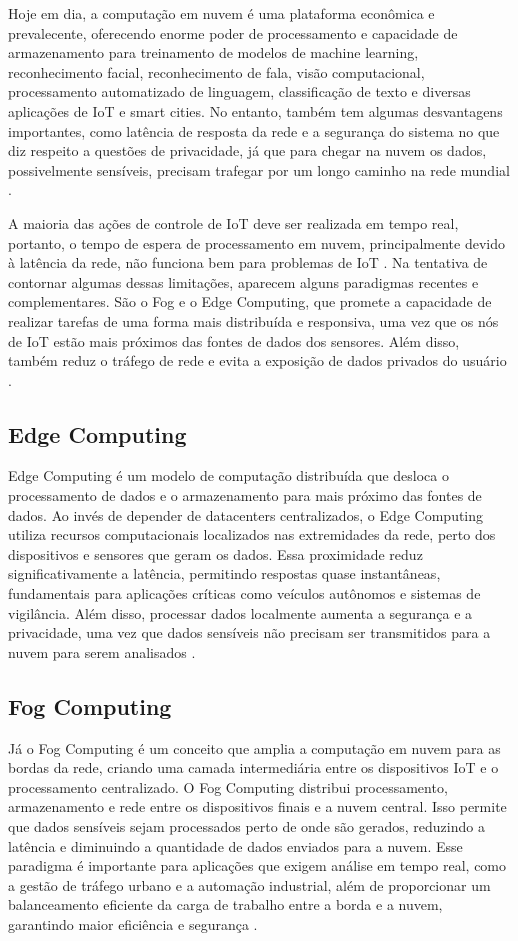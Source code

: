Hoje em dia, a computação em nuvem é uma plataforma econômica e prevalecente, oferecendo enorme poder de processamento e capacidade de armazenamento para treinamento de modelos de machine learning, reconhecimento facial, reconhecimento de fala, visão computacional, processamento automatizado de linguagem, classificação de texto e diversas aplicações de IoT e smart cities. No entanto, também tem algumas desvantagens importantes, como latência de resposta da rede e a segurança do sistema no que diz respeito a questões de privacidade, já que para chegar na nuvem os dados, possivelmente sensíveis, precisam trafegar por um longo caminho na rede mundial \cite{Pacheco2018}.

A maioria das ações de controle de IoT deve ser realizada em tempo real, portanto, o tempo de espera de processamento em nuvem, principalmente devido à latência da rede, não funciona bem para problemas de IoT \cite{Singh2017}. Na tentativa de contornar algumas dessas limitações, aparecem alguns paradigmas recentes e complementares. São o Fog e o Edge Computing, que promete a capacidade de realizar tarefas de uma forma mais distribuída e responsiva, uma vez que os nós de IoT estão mais próximos das fontes de dados dos sensores. Além disso, também reduz o tráfego de rede e evita a exposição de dados privados do usuário \cite{Pacheco2018}.

\subsection{Edge Computing}
Edge Computing é um modelo de computação distribuída que desloca o processamento de dados e o armazenamento para mais próximo das fontes de dados. Ao invés de depender de datacenters centralizados, o Edge Computing utiliza recursos computacionais localizados nas extremidades da rede, perto dos dispositivos e sensores que geram os dados. Essa proximidade reduz significativamente a latência, permitindo respostas quase instantâneas, fundamentais para aplicações críticas como veículos autônomos e sistemas de vigilância. Além disso, processar dados localmente aumenta a segurança e a privacidade, uma vez que dados sensíveis não precisam ser transmitidos para a nuvem para serem analisados \cite{Satyanarayanan2017}.

\subsection{Fog Computing}
Já o Fog Computing é um conceito que amplia a computação em nuvem para as bordas da rede, criando uma camada intermediária entre os dispositivos IoT e o processamento centralizado. O Fog Computing distribui processamento, armazenamento e rede entre os dispositivos finais e a nuvem central. Isso permite que dados sensíveis sejam processados perto de onde são gerados, reduzindo a latência e diminuindo a quantidade de dados enviados para a nuvem. Esse paradigma é importante para aplicações que exigem análise em tempo real, como a gestão de tráfego urbano e a automação industrial, além de proporcionar um balanceamento eficiente da carga de trabalho entre a borda e a nuvem, garantindo maior eficiência e segurança \cite{Bonomi2012}.

